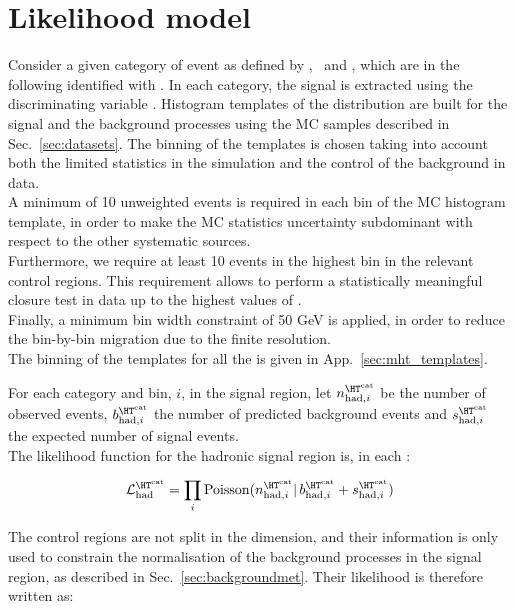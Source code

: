 \section{Likelihood model}
\label{sec:likelihood}

Consider a given category of event as defined by \njet, \nb~and \scalht, which are in the following identified with \htcat. 
In each category, the signal is extracted using the discriminating variable \mht. 
Histogram templates of the \mht distribution are built for the signal and the background processes 
using the MC samples described in Sec.~\ref{sec:datasets}. 
The binning of the templates is chosen taking into account both the limited statistics in the simulation and 
the control of the background in data. \\
A minimum of 10 unweighted events is required in each bin of the MC histogram template, 
in order to make the MC statistics uncertainty subdominant with respect to the other systematic sources. \\
Furthermore, we require at least 10 events in the highest bin in the relevant control regions.
This requirement allows to perform a statistically meaningful closure test in data up to the highest values of \mht.\\
Finally, a minimum bin width constraint of 50 GeV is applied, 
in order to reduce the bin-by-bin migration due to the finite \mht resolution.\\
The binning of the \mht templates for all the \htcat is given in App.~\ref{sec:mht_templates}.


For each category \htcat and \mht bin, $i$, in the signal region, let $n^{\htcat}_{\mathrm{had},i}$ be the number of observed events, $b^{\htcat}_{\mathrm{had},i}$ the number of predicted background events and $s^{\htcat}_{\mathrm{had},i}$ the expected number of signal events. \\
The likelihood function for the hadronic signal region is, in each \htcat:

\begin{equation}
\mathcal{L}^{\htcat}_{\mathrm{had}}=\prod_i \mathrm{Poisson}(n^{\htcat}_{\mathrm{had},i} |\, b^{\htcat}_{\mathrm{had},i} + s^{\htcat}_{\mathrm{had},i})
\label{eq:hadronicLikelihood}
\end{equation}

The control regions are not split in the \mht dimension, and their information is only used to constrain the normalisation of the background processes 
in the signal region, as described in Sec.~\ref{sec:backgroundmet}. 
Their likelihood is therefore written as:

